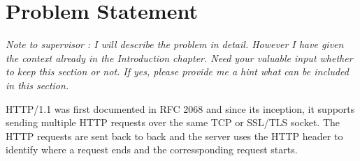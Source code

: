 \chapter{Problem Statement}
\textit{Note to supervisor : I will describe the problem in detail. However I have given the context already in the Introduction chapter. Need your valuable input whether to keep this section or not. If yes, please provide me a hint what can be included in this section. }

HTTP/1.1 was first documented in RFC 2068 \cite{b9} and since its inception, it supports sending multiple HTTP requests over the same TCP or SSL/TLS socket. The HTTP requests are sent back to back and the server uses the HTTP header to identify where a request ends and the corressponding request starts. 
